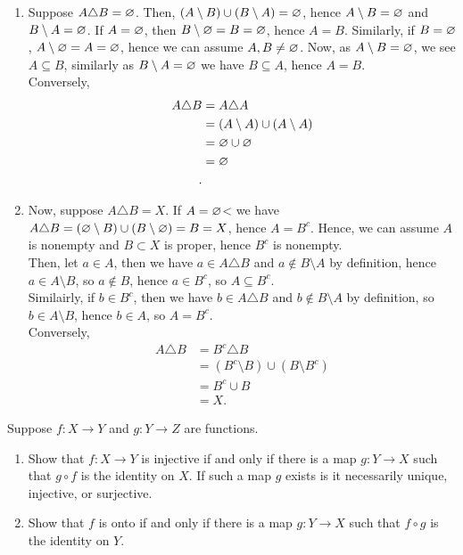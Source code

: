\documentclass[a4paper]{article}
\begin{document}
\begin{solution}
	\begin{enumerate}
		\item Suppose \(A \triangle B = \varnothing\). Then, \(\left( A \setminus B \right)  \cup \left( B \setminus A \right)  = \varnothing\), hence \(A \setminus B = \varnothing\) and \(B \setminus A = \varnothing\). If \(A = \varnothing\), then \(B \setminus \varnothing = B = \varnothing\), hence \(A = B\). Similarly, if \(B = \varnothing\), \(A \setminus \varnothing = A = \varnothing\), hence we can assume \(A, B \neq \varnothing\). Now, as \(A \setminus B = \varnothing\), we see \(A \subseteq B\), similarly as \(B \setminus A = \varnothing\) we have \(B \subseteq A\), hence \(A = B\).\\
			Conversely,
	\begin{align*}
		A \triangle B &=  A\triangle A \\
			      &= \left( A \setminus A \right) \cup \left( A \setminus A \right)   \\
			      &= \varnothing \cup \varnothing \\
			      &= \varnothing \\
	.\end{align*}
\item Now, suppose \(A \triangle B = X\). If \(A  = \varnothing\)< we have \(A \triangle B = \left( \varnothing \setminus B \right) \cup \left( B \setminus \varnothing \right) = B = X\), hence \(A = B^{c}\). Hence, we can assume \(A\) is nonempty and \(B \subset X\) is proper, hence \(B^{c}\) is nonempty.\\
	Then, let \(a \in A\), then we have \(a \in A \triangle B\) and \(a \not\in B \setminus A\) by definition, hence \(a \in A \setminus B\), so \(a \not\in B\), hence \(a \in B^{c}\), so \(A \subseteq B^{c}\).\\
	Similairly, if \(b \in B^{c}\), then we have \(b \in A\triangle B\) and \( b \not\in B \setminus A\) by definition, so \(b \in A \setminus B\), hence \(b \in A\), so \(A = B^{c}\).\\
	Conversely,
	\begin{align*}
	A \triangle B &=  B^{c} \triangle B \\
		      &= \left( B^{c} \setminus B \right) \cup \left( B \setminus B^{c} \right)  \\
		      &= B^{c} \cup B \\
		      &=  X
	.\end{align*}
	\end{enumerate}
\end{solution}
\newpage
\begin{problem}[3]
	Suppose \(f:X \to Y\) and \(g: Y\to Z\)  are functions.
	\begin{enumerate}
		\item Show that \(f:X \to Y\) is injective if and only if there is a map \(g: Y \to X\) such that \(g \circ f\) is the identity on \(X\). If such a map \(g\) exists is it necessarily unique, injective, or surjective.
			\item Show that \(f\) is onto if and only if there is a map \(g:Y \to X\) such that \(f \circ g\) is the identity on \(Y\).
	\end{enumerate}
\end{problem}
\end{document}
